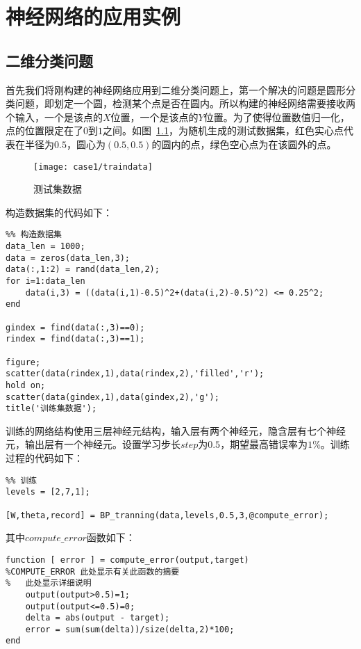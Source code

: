 \chapter{神经网络的应用实例}
\label{cha:usecase}
\section{二维分类问题}

首先我们将刚构建的神经网络应用到二维分类问题上，第一个解决的问题是圆形分类问题，即划定一个圆，检测某个点是否在圆内。所以构建的神经网络需要接收两个输入，一个是该点的$X$位置，一个是该点的$Y$位置。为了使得位置数值归一化，点的位置限定在了$0$到$1$之间。如图~\ref{fig:case1:traindata}，为随机生成的测试数据集，红色实心点代表在半径为$0.5$，圆心为$(0.5,0.5)$的圆内的点，绿色空心点为在该圆外的点。

\begin{figure}[h] 
 \centering
  \texttt{[image: case1/traindata]}
  \caption{测试集数据}
  \label{fig:case1:traindata}
\end{figure}

构造数据集的代码如下：

\begin{lstlisting}
%% 构造数据集
data_len = 1000;
data = zeros(data_len,3);
data(:,1:2) = rand(data_len,2);
for i=1:data_len
    data(i,3) = ((data(i,1)-0.5)^2+(data(i,2)-0.5)^2) <= 0.25^2;
end

gindex = find(data(:,3)==0);
rindex = find(data(:,3)==1);

figure;
scatter(data(rindex,1),data(rindex,2),'filled','r');
hold on;
scatter(data(gindex,1),data(gindex,2),'g');
title('训练集数据');
\end{lstlisting}

训练的网络结构使用三层神经元结构，输入层有两个神经元，隐含层有七个神经元，输出层有一个神经元。设置学习步长$step$为$0.5$，期望最高错误率为$1$\%。训练过程的代码如下：

\begin{lstlisting}
%% 训练
levels = [2,7,1];

[W,theta,record] = BP_tranning(data,levels,0.5,3,@compute_error);
\end{lstlisting}

其中$compute\_error$函数如下：

\begin{lstlisting}
function [ error ] = compute_error(output,target)
%COMPUTE_ERROR 此处显示有关此函数的摘要
%   此处显示详细说明
    output(output>0.5)=1;
    output(output<=0.5)=0;
    delta = abs(output - target);
    error = sum(sum(delta))/size(delta,2)*100;
end
\end{lstlisting}


